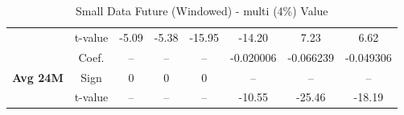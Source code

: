 \documentclass[11pt,english,a4paper,hidelinks]{book}
\begin{document}
\begin{table}[H]
\begin{tabular}{lccccccc}
            & t-value & -5.09     & -5.38     & -15.95    & -14.20    & 7.23      & 6.62      \\
        \cmidrule{1-8}
        \multirow{3}{*}{\textbf{Avg 24M}}
            & Coef.   & --        & --        & --        & -0.020006 & -0.066239 & -0.049306 \\
            & Sign    & 0         & 0         & 0         & –         & –         & –         \\
            & t-value & --        & --        & --        & -10.55    & -25.46    & -18.19    \\
        \bottomrule
    \end{tabular}
    \caption{Small Data Future (Windowed) - \acrshort{multi} (4\%) Value}
    \label{tab:value_windowed_reformat}
\end{table}
\end{document}
